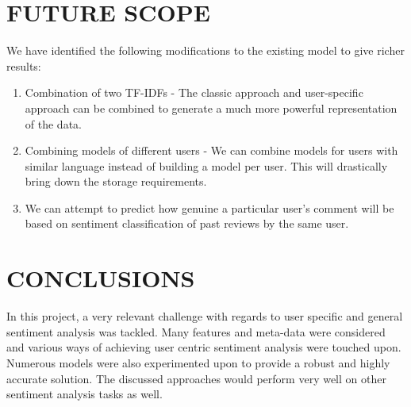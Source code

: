 \documentclass[letterpaper, 10 pt, conference]{ieeeconf}  %
\begin{document}
\section{FUTURE SCOPE}

We have identified the following modifications to the existing model to give richer results:
\begin{enumerate}
\item Combination of two TF-IDFs - The classic approach and user-specific approach can be combined to generate a much more powerful representation of the data.
\item Combining models of different users - We can combine models for users with similar language instead of building a model per user. This will drastically bring down the storage requirements. 
\item We can attempt to predict how genuine a particular user’s comment will be based on sentiment classification of past reviews by the same user.

\end{enumerate}


\section{CONCLUSIONS}

In this project, a very relevant challenge with regards to user specific and general sentiment analysis was tackled. Many features and meta-data were considered and various ways of achieving user centric sentiment analysis were touched upon. Numerous models were also experimented upon to provide a robust and highly accurate solution. The discussed approaches would perform very well on other sentiment analysis tasks as well.

\addtolength{\textheight}{-12cm}   %




\end{document}
